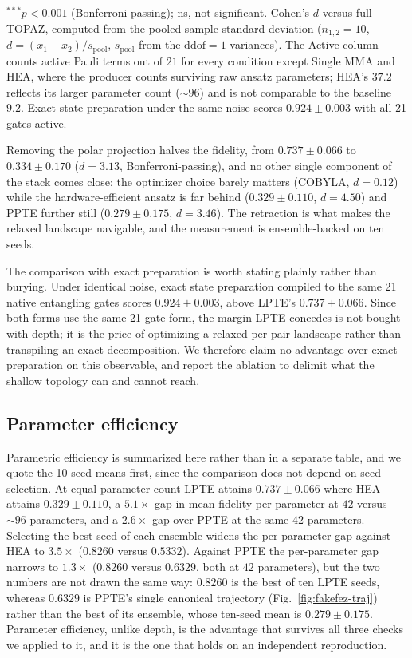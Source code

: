 \documentclass[twocolumn,aps,prl,superscriptaddress,showkeys]{revtex4-2}
\theoremstyle{plain}
\theoremstyle{definition}
\begin{document}
\begin{table}[htbp]
\vspace{2pt}
{\raggedright\scriptsize $^{***}p<0.001$ (Bonferroni-passing); ns, not significant. Cohen's $d$ versus full TOPAZ, computed from the pooled sample standard deviation ($n_{1,2}=10$, $d=(\bar x_{1}-\bar x_{2})/s_{\mathrm{pool}}$, $s_{\mathrm{pool}}$ from the $\mathrm{ddof}=1$ variances). The Active column counts active Pauli terms out of $21$ for every condition except Single MMA and HEA, where the producer counts surviving raw ansatz parameters; HEA's $37.2$ reflects its larger parameter count ($\sim\!96$) and is not comparable to the baseline $9.2$. Exact state preparation under the same noise scores $0.924\pm0.003$ with all 21 gates active.}
\end{table}

Removing the polar projection halves the fidelity, from $0.737\pm0.066$ to $0.334\pm0.170$ ($d=3.13$, Bonferroni-passing), and no other single component of the stack comes close: the optimizer choice barely matters (COBYLA, $d=0.12$) while the hardware-efficient ansatz is far behind ($0.329\pm0.110$, $d=4.50$) and PPTE further still ($0.279\pm0.175$, $d=3.46$). The retraction is what makes the relaxed landscape navigable, and the measurement is ensemble-backed on ten seeds.

The comparison with exact preparation is worth stating plainly rather than burying. Under identical noise, exact state preparation compiled to the same 21 native entangling gates scores $0.924\pm0.003$, above LPTE's $0.737\pm0.066$. Since both forms use the same 21-gate form, the margin LPTE concedes is not bought with depth; it is the price of optimizing a relaxed per-pair landscape rather than transpiling an exact decomposition. We therefore claim no advantage over exact preparation on this observable, and report the ablation to delimit what the shallow topology can and cannot reach.

\subsection{Parameter efficiency}

Parametric efficiency is summarized here rather than in a separate table, and we quote the 10-seed means first, since the comparison does not depend on seed selection. At equal parameter count LPTE attains $0.737\pm0.066$ where HEA attains $0.329\pm0.110$, a $5.1\times$ gap in mean fidelity per parameter at $42$ versus $\sim96$ parameters, and a $2.6\times$ gap over PPTE at the same $42$ parameters. Selecting the best seed of each ensemble widens the per-parameter gap against HEA to $3.5\times$ ($0.8260$ versus $0.5332$). Against PPTE the per-parameter gap narrows to $1.3\times$ ($0.8260$ versus $0.6329$, both at $42$ parameters), but the two numbers are not drawn the same way: $0.8260$ is the best of ten LPTE seeds, whereas $0.6329$ is PPTE's single canonical trajectory (Fig.~\ref{fig:fakefez-traj}) rather than the best of its ensemble, whose ten-seed mean is $0.279\pm0.175$. Parameter efficiency, unlike depth, is the advantage that survives all three checks we applied to it, and it is the one that holds on an independent reproduction.
\end{document}
